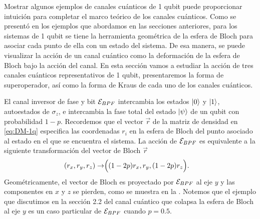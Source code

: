 Mostrar algunos ejemplos de canales cuánticos de 1 qubit 
puede proporcionar intuición 
para completar el marco teórico de los canales cuánticos. 
Como se presentó en los ejemplos que abordamos en las 
secciones anteriores, para los sistemas de 1 qubit se tiene la
herramienta geométrica de la esfera de Bloch para asociar cada 
punto de ella con un estado del sistema. De esa manera, 
se puede visualizar la acción de un canal cuántico como la 
deformación de la esfera de Bloch bajo la acción del canal.
En esta sección vamos a estudiar la acción de tres canales 
cuánticos representativos de 1 qubit, presentaremos
la forma de superoperador, así como la forma de Kraus de 
cada uno de los canales cuánticos.

El canal inversor de fase y bit $\mathcal{E}_{BPF}$ intercambia 
los estados $\ket{0}$ y $\ket{1}$, 
autoestados de $\sigma_z$, e intercambia la fase total
del estado $\ket{\psi}$ de un qubit con probabilidad $1-p$. 
Recordemos que el vector $\vec{r}$ de la matriz de densidad en \eqref{eq:DM-1q} 
especifica las coordenadas $r_i$ en la esfera de Bloch del punto asociado al estado
en el que se encuentra el sistema. La acción de $\mathcal{E}_{BPF}$ es 
equivalente a la siguiente transformación del vector de Bloch $\vec{r}$
\begin{align}
\qty(r_x,r_y,r_z)\rightarrow&\Big(\qty(1-2p)r_x,r_y,\qty(1-2p)r_z\Big).
\label{eq:bit-phase-flip-Bloch-trans}
\end{align}
Geométricamente, el vector de Bloch es proyectado por $\mathcal{E}_{BPF}$ 
al eje $y$ y las componentes en $x$ y $z$ se pierden, como 
se muestra en la .
Notemos que el ejemplo que discutimos en la sección 2.2 del 
canal cuántico que colapsa la esfera de Bloch al eje $y$ es un caso
particular de $\mathcal{E}_{BPF}$ cuando $p=0.5$.
